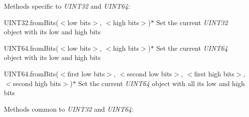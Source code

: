 Methods specific to {\itshape U\+I\+N\+T32} and {\itshape U\+I\+N\+T64}\+:


\begin{DoxyItemize}
\item {\ttfamily U\+I\+N\+T32.\+from\+Bits($<$low bits$>$, $<$high bits$>$)$\ast$} Set the current {\itshape U\+I\+N\+T32} object with its low and high bits
\item {\ttfamily U\+I\+N\+T64.\+from\+Bits($<$low bits$>$, $<$high bits$>$)$\ast$} Set the current {\itshape U\+I\+N\+T64} object with its low and high bits
\item {\ttfamily U\+I\+N\+T64.\+from\+Bits($<$first low bits$>$, $<$second low bits$>$, $<$first high bits$>$, $<$second high bits$>$)$\ast$} Set the current {\itshape U\+I\+N\+T64} object with all its low and high bits
\end{DoxyItemize}

Methods common to {\itshape U\+I\+N\+T32} and {\itshape U\+I\+N\+T64}\+:


